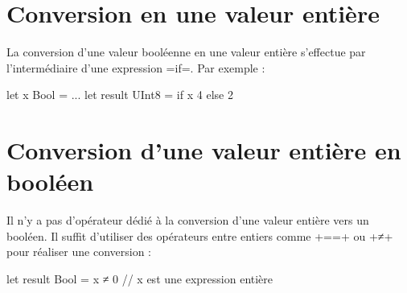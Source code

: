 \section{Conversion en une valeur entière}

La conversion d'une valeur booléenne en une valeur entière s'effectue par l'intermédiaire d'une expression \plm=if=. Par exemple :

\begin{PLM}
let x Bool = ...
let result UInt8 = if x { 4 }else{ 2 }
\end{PLM}


\section{Conversion d'une valeur entière en booléen}

Il n'y a pas d'opérateur dédié à la conversion d'une valeur entière vers un booléen. Il suffit d'utiliser des opérateurs entre entiers comme \plm+==+ ou \plm+≠+ pour réaliser une conversion :

\begin{PLM}
let result Bool = x ≠ 0 // x est une expression entière
\end{PLM}


